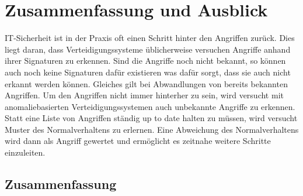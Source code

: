 \chapter{Zusammenfassung und Ausblick}

IT-Sicherheit ist in der Praxis oft einen Schritt hinter den Angriffen zurück.
Dies liegt daran, dass Verteidigungssysteme üblicherweise versuchen Angriffe anhand ihrer Signaturen zu erkennen.
Sind die Angriffe noch nicht bekannt, so können auch noch keine Signaturen dafür existieren was dafür sorgt, dass sie auch nicht erkannt werden können.
Gleiches gilt bei Abwandlungen von bereits bekannten Angriffen.
Um den Angriffen nicht immer hinterher zu sein, wird versucht mit anomaliebasierten Verteidigungssystemen auch unbekannte Angriffe zu erkennen.
Statt eine Liste von Angriffen ständig up to date halten zu müssen, wird versucht Muster des Normalverhaltens zu erlernen.
Eine Abweichung des Normalverhaltens wird dann als Angriff gewertet und ermöglicht es zeitnahe weitere Schritte einzuleiten.

\section{Zusammenfassung}

